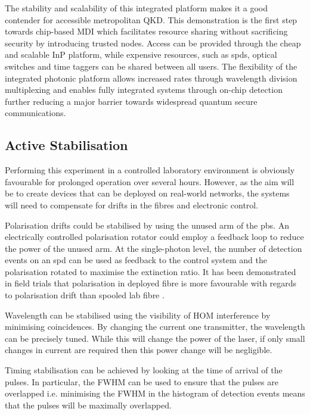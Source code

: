 The stability and scalability of this integrated platform makes it a good contender for accessible metropolitan \ac{QKD}. This demonstration is the first step towards chip-based \ac{MDI} which facilitates resource sharing without sacrificing security by introducing trusted nodes. Access can be provided through the cheap and scalable \ac{InP} platform, while expensive resources, such as \acp{spd}, optical switches and time taggers can be shared between all users. The flexibility of the integrated photonic platform allows increased rates through wavelength division multiplexing \cite{price2018} and enables fully integrated systems through on-chip detection \cite{akhlaghi2015} further reducing a major barrier towards widespread quantum secure communications.

\subsection{Active Stabilisation}

Performing this experiment in a controlled laboratory environment is obviously favourable for prolonged operation over several hours. However, as the aim will be to create devices that can be deployed on real-world networks, the systems will need to compensate for drifts in the fibres and electronic control.


Polarisation drifts could be stabilised by using the unused arm of the \ac{pbs}. An electrically controlled polarisation rotator could employ a feedback loop to reduce the power of the unused arm. At the single-photon level, the number of detection events on an \ac{spd} can be used as feedback to the control system and the polarisation rotated to maximise the extinction ratio. It has been demonstrated in field trials that polarisation in deployed fibre is more favourable with regards to polarisation drift than spooled lab fibre \cite{wengerowsky2019}.

Wavelength can be stabilised using the visibility of \ac{HOM} interference by minimising coincidences. By changing the current one transmitter, the wavelength can be precisely tuned. While this will change the power of the laser, if only small changes in current are required then this power change will be negligible.

Timing stabilisation can be achieved by looking at the time of arrival of the pulses. In particular, the \ac{FWHM} can be used to ensure that the pulses are overlapped i.e. minimising the \ac{FWHM} in the histogram of detection events means that the pulses will be maximally overlapped.


